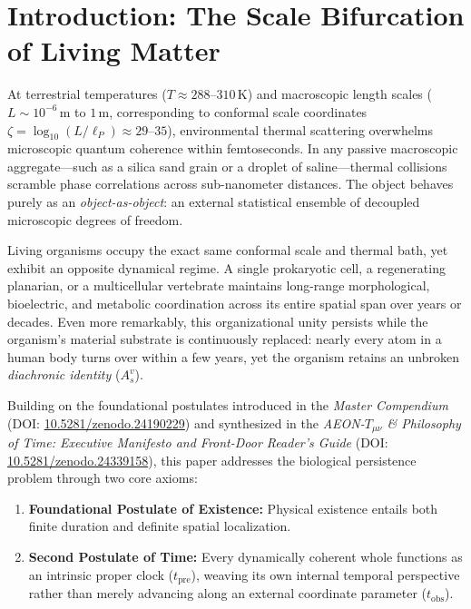 \documentclass[11pt,a4paper]{article}
\begin{document}
\section{Introduction: The Scale Bifurcation of Living Matter}

At terrestrial temperatures ($T \approx 288\text{--}310\,\mathrm{K}$) and macroscopic length scales ($L \sim 10^{-6}\,\mathrm{m}$ to $1\,\mathrm{m}$, corresponding to conformal scale coordinates $\zeta = \log_{10}(L/\ell_P) \approx 29\text{--}35$), environmental thermal scattering overwhelms microscopic quantum coherence within femtoseconds. In any passive macroscopic aggregate---such as a silica sand grain or a droplet of saline---thermal collisions scramble phase correlations across sub-nanometer distances. The object behaves purely as an \emph{object-as-object}: an external statistical ensemble of decoupled microscopic degrees of freedom.

Living organisms occupy the exact same conformal scale and thermal bath, yet exhibit an opposite dynamical regime. A single prokaryotic cell, a regenerating planarian, or a multicellular vertebrate maintains long-range morphological, bioelectric, and metabolic coordination across its entire spatial span over years or decades. Even more remarkably, this organizational unity persists while the organism's material substrate is continuously replaced: nearly every atom in a human body turns over within a few years, yet the organism retains an unbroken \emph{diachronic identity} ($A_s^v$).

Building on the foundational postulates introduced in the \emph{Master Compendium} (DOI: \href{https://doi.org/10.5281/zenodo.24190229}{10.5281/zenodo.24190229}) and synthesized in the \emph{AEON-$T_{\mu\nu}$ \& Philosophy of Time: Executive Manifesto and Front-Door Reader's Guide} (DOI: \href{https://doi.org/10.5281/zenodo.24339158}{10.5281/zenodo.24339158}), this paper addresses the biological persistence problem through two core axioms:
\begin{enumerate}
    \item \textbf{Foundational Postulate of Existence:} Physical existence entails both finite duration and definite spatial localization.
    \item \textbf{Second Postulate of Time:} Every dynamically coherent whole functions as an intrinsic proper clock ($t_{\mathrm{pre}}$), weaving its own internal temporal perspective rather than merely advancing along an external coordinate parameter ($t_{\mathrm{obs}}$).
\end{enumerate}
\end{document}
